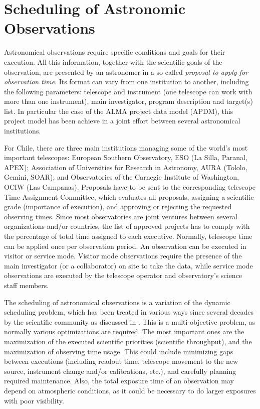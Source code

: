 \section{Scheduling of Astronomic Observations}

Astronomical observations require specific conditions and goals for their execution. All this information, together with the scientific goals of the observation, are presented by an astronomer in a so called \textit{proposal to apply for observation time}. Its format can vary from one institution to another, including the following parameters: telescope and instrument (one telescope can work with more than one instrument), main investigator, program description and target(s) list. In particular the case of the ALMA project data model (APDM), this project model has been achieve in a joint effort between several astronomical institutions.

For Chile, there are three main institutions managing some of the world’s most important telescopes: European Southern Observatory, ESO (La Silla, Paranal, APEX); Association of Universities for Research in Astronomy, AURA (Tololo, Gemini, SOAR); and Observatories of the Carnegie Institute of Washington, OCIW (Las Campanas). Proposals have to be sent to the corresponding telescope Time Assignment Committee, which evaluates all proposals, assigning a scientific grade (importance of execution), and approving or rejecting the requested observing times. Since most observatories are joint ventures between several organizations and/or countries, the list of approved projects has to comply with the percentage of total time assigned to each executive. Normally, telescope time can be applied once per observation period. An observation can be executed in visitor or service mode. Visitor mode observations require the presence of the main investigator (or a collaborator) on site to take the data, while service mode observations are executed by the telescope operator and observatory’s science staff members.

The scheduling of astronomical observations is a variation of the dynamic scheduling problem, which has been treated in various ways since several decades by the scientific community as discussed in \cite{gomez03}. This is a multi-objective problem, as normally various optimizations are required. The most important ones are the maximization of the executed scientific priorities (scientific throughput), and the maximization of observing time usage. This could include minimizing gaps between executions (including readout time, telescope movement to the new source, instrument change and/or calibrations, etc.), and carefully planning required maintenance. Also, the total exposure time of an observation may depend on atmospheric conditions, as it could be necessary to do larger exposures with poor visibility.

